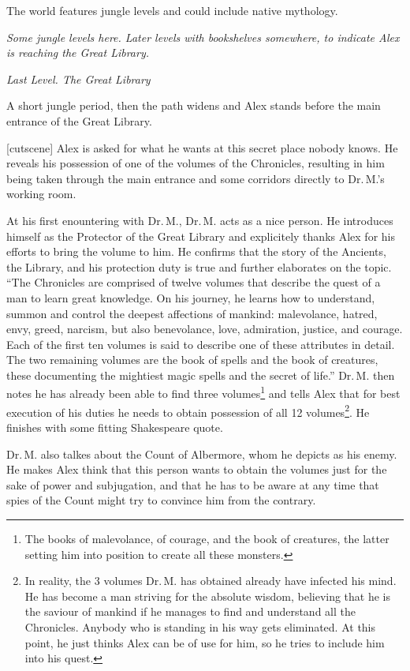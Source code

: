 \documentclass{gd-document}
\newcommand\DrM{Dr.\,M.\xspace}
\newcommand\level[1]{\textit{#1}}
\begin{document}
The world features jungle levels and could include native
mythology.

\level{Some jungle levels here. Later levels with bookshelves
  somewhere, to indicate Alex is reaching the Great Library.}

\level{Last Level. The Great Library}

A short jungle period, then the path widens and Alex stands before the
main entrance of the Great Library.

[cutscene]
Alex is asked for what he wants at this secret place nobody knows. He
reveals his possession of one of the volumes of the Chronicles,
resulting in him being taken through the main entrance and some
corridors directly to \DrM{}’s working room.

At his first enountering with \DrM, \DrM acts as a nice person. He
introduces himself as the Protector of the Great Library and
explicitely thanks Alex for his efforts to bring the volume to him. He
confirms that the story of the Ancients, the Library, and his
protection duty is true and further elaborates on the topic. “The
Chronicles are comprised of twelve volumes that describe the quest of
a man to learn great knowledge. On his journey, he learns how to
understand, summon and control the deepest affections of mankind:
malevolance, hatred, envy, greed, narcism, but also benevolance, love,
admiration, justice, and courage. Each of the first ten volumes is
said to describe one of these attributes in detail. The two remaining
volumes are the book of spells and the book of creatures, these
documenting the mightiest magic spells and the secret of life.” \DrM
then notes he has already been able to find three volumes\footnote{The
  books of malevolance, of courage, and the book of creatures, the
  latter setting him into position to create all these monsters.}  and
tells Alex that for best execution of his duties he needs to obtain
possession of all 12 volumes\footnote{In reality, the 3 volumes \DrM
  has obtained already have infected his mind. He has become a man
  striving for the absolute wisdom, believing that he is the saviour
  of mankind if he manages to find and understand all the
  Chronicles. Anybody who is standing in his way gets eliminated. At
  this point, he just thinks Alex can be of use for him, so he tries
  to include him into his quest.}. He finishes with some fitting
Shakespeare quote.

\DrM also talkes about the Count of Albermore, whom he depicts as his
enemy. He makes Alex think that this person wants to obtain the
volumes just for the sake of power and subjugation, and that he has to
be aware at any time that spies of the Count might try to convince him
from the contrary.
\end{document}
